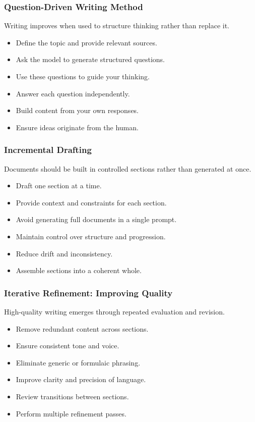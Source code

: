 \documentclass{beamer}
\begin{document}
\frame
{
   \frametitle{Question-Driven Writing Method}

    Writing improves when used to structure thinking rather than replace it.

    \begin{itemize}
        \item Define the topic and provide relevant sources.
        \item Ask the model to generate structured questions.
        \item Use these questions to guide your thinking.
        \item Answer each question independently.
        \item Build content from your own responses.
        \item Ensure ideas originate from the human.
    \end{itemize}
}

\frame
{
   \frametitle{Incremental Drafting}

    Documents should be built in controlled sections rather than generated at once.

    \begin{itemize}
        \item Draft one section at a time.
        \item Provide context and constraints for each section.
        \item Avoid generating full documents in a single prompt.
        \item Maintain control over structure and progression.
        \item Reduce drift and inconsistency.
        \item Assemble sections into a coherent whole.
    \end{itemize}
}

\frame
{
   \frametitle{Iterative Refinement: Improving Quality}

    High-quality writing emerges through repeated evaluation and revision.

    \begin{itemize}
        \item Remove redundant content across sections.
        \item Ensure consistent tone and voice.
        \item Eliminate generic or formulaic phrasing.
        \item Improve clarity and precision of language.
        \item Review transitions between sections.
        \item Perform multiple refinement passes.
    \end{itemize}
}
\end{document}
